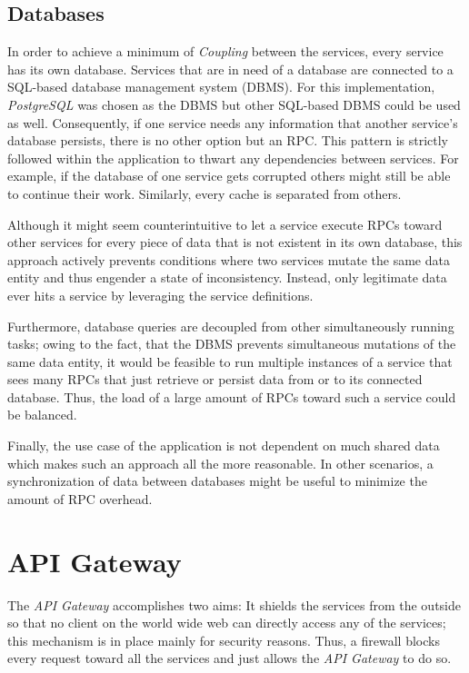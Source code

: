 \documentclass[12pt,a4paper,twoside]{report}
\begin{document}
\subsection{Databases} \label{subsect:databases}

In order to achieve a minimum of \textit{Coupling} between the services,
every service has its own database.
Services that are in need of a database are connected to a SQL-based
database management system (DBMS).
For this implementation, \textit{PostgreSQL} was chosen as the DBMS but
other SQL-based DBMS could be used as well.
Consequently, if one service needs any information that another service's
database persists, there is no other option but an RPC.
This pattern is strictly followed within the application to thwart any
dependencies between services. For example, if the database of one service gets
corrupted others might still be able to continue their work.
Similarly, every cache is separated from others.

Although it might seem counterintuitive to let a service execute RPCs toward
other services for every piece of data that is not existent in its own database,
this approach actively prevents conditions where two services mutate the same
data entity and thus engender a state of inconsistency.
Instead, only legitimate data ever hits a service by leveraging the service definitions.

Furthermore, database queries are decoupled from other simultaneously running tasks;
owing to the fact, that the DBMS prevents
simultaneous mutations of the same data entity, it would be feasible
to run multiple instances of a service that sees many RPCs that just
retrieve or persist data from or to its connected database.
Thus, the load of a large amount of RPCs toward such a service could be balanced.

Finally, the use case of the application is not dependent on much
shared data which makes such an approach all the more reasonable.
In other scenarios, a synchronization of data between databases might be useful
to minimize the amount of RPC overhead.


\section{API Gateway} \label{sect:api-gateway}

The \textit{API Gateway} accomplishes two aims:
It shields the services from the outside so that no client on the world wide web
can directly access any of the services; this mechanism is in place mainly for
security reasons.
Thus, a firewall blocks every request toward all the services and just allows
the \textit{API Gateway} to do so.
\end{document}
